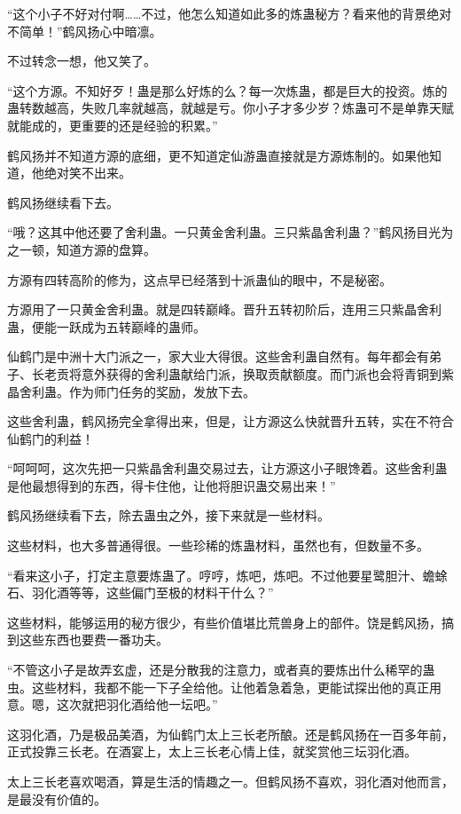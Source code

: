 \begin{this_body}
“这个小子不好对付啊……不过，他怎么知道如此多的炼蛊秘方？看来他的背景绝对不简单！”鹤风扬心中暗凛。

不过转念一想，他又笑了。

“这个方源。不知好歹！蛊是那么好炼的么？每一次炼蛊，都是巨大的投资。炼的蛊转数越高，失败几率就越高，就越是亏。你小子才多少岁？炼蛊可不是单靠天赋就能成的，更重要的还是经验的积累。”

鹤风扬并不知道方源的底细，更不知道定仙游蛊直接就是方源炼制的。如果他知道，他绝对笑不出来。

鹤风扬继续看下去。

“哦？这其中他还要了舍利蛊。一只黄金舍利蛊。三只紫晶舍利蛊？”鹤风扬目光为之一顿，知道方源的盘算。

方源有四转高阶的修为，这点早已经落到十派蛊仙的眼中，不是秘密。

方源用了一只黄金舍利蛊。就是四转巅峰。晋升五转初阶后，连用三只紫晶舍利蛊，便能一跃成为五转巅峰的蛊师。

仙鹤门是中洲十大门派之一，家大业大得很。这些舍利蛊自然有。每年都会有弟子、长老贡将意外获得的舍利蛊献给门派，换取贡献额度。而门派也会将青铜到紫晶舍利蛊。作为师门任务的奖励，发放下去。

这些舍利蛊，鹤风扬完全拿得出来，但是，让方源这么快就晋升五转，实在不符合仙鹤门的利益！

“呵呵呵，这次先把一只紫晶舍利蛊交易过去，让方源这小子眼馋着。这些舍利蛊是他最想得到的东西，得卡住他，让他将胆识蛊交易出来！”

鹤风扬继续看下去，除去蛊虫之外，接下来就是一些材料。

这些材料，也大多普通得很。一些珍稀的炼蛊材料，虽然也有，但数量不多。

“看来这小子，打定主意要炼蛊了。哼哼，炼吧，炼吧。不过他要星鹭胆汁、蟾蜍石、羽化酒等等，这些偏门至极的材料干什么？”

这些材料，能够运用的秘方很少，有些价值堪比荒兽身上的部件。饶是鹤风扬，搞到这些东西也要费一番功夫。

“不管这小子是故弄玄虚，还是分散我的注意力，或者真的要炼出什么稀罕的蛊虫。这些材料，我都不能一下子全给他。让他着急着急，更能试探出他的真正用意。嗯，这次就把羽化酒给他一坛吧。”

这羽化酒，乃是极品美酒，为仙鹤门太上三长老所酿。还是鹤风扬在一百多年前，正式投靠三长老。在酒宴上，太上三长老心情上佳，就奖赏他三坛羽化酒。

太上三长老喜欢喝酒，算是生活的情趣之一。但鹤风扬不喜欢，羽化酒对他而言，是最没有价值的。


\end{this_body}
